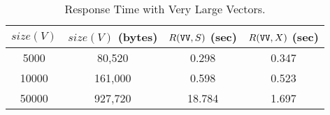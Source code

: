 \documentclass{sig-alternate}
\begin{document}

\begin{table}[t]

  \begin{center}
  \begin{tabular}{| c | c | c | c |}
  \hline
  $size(V)$ & $size(V)$ (bytes) & $R(\mbox{\tt VV}, S)$ (sec) &  
  $R(\mbox{\tt VV}, X)$ (sec) \\  \hline
  5000  & 80,520   & 0.298 & 0.347\\
  10000 & 161,000  & 0.598 & 0.523\\
  50000 & 927,720  & 18.784 & 1.697\\
  \hline
  \end{tabular} 

  \vspace*{.1in}


  \end{center} %

  \vspace*{-.175in}
  \caption{Response Time with Very Large Vectors.}
  \label{tab:increasebig}

\vspace*{-.2in}
\end{table}



\end{document}
